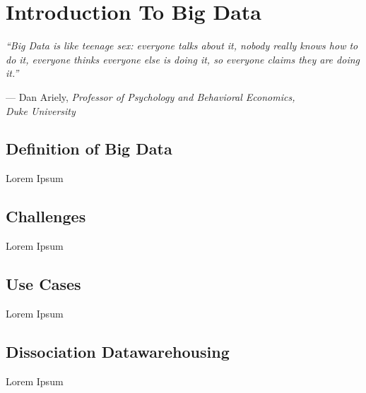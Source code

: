 \chapter{Introduction To Big Data}
\label{chapter_bigdata}
\setlength{\epigraphwidth}{0.95\textwidth}
\setlength\epigraphrule{0pt}
\epigraph{\itshape ``Big Data is like teenage sex: everyone talks about it, nobody really knows how to do it, everyone thinks everyone else is doing it, so everyone claims they are doing it.''}{--- Dan Ariely, \textit{Professor of Psychology and Behavioral Economics,\\ Duke University}}


\section{Definition of Big Data}
\label{bd_def}
Lorem Ipsum

\section{Challenges}
\label{bd_def}
Lorem Ipsum

\section{Use Cases}
\label{bd_def}
Lorem Ipsum

\section{Dissociation Datawarehousing}
\label{bd_def}
Lorem Ipsum